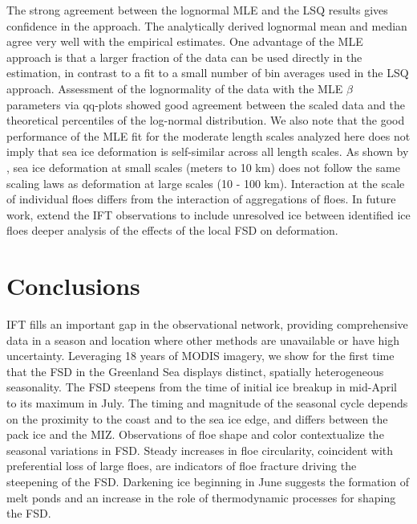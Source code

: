 \documentclass[review, jog]{igs}
\begin{document}
The strong agreement between the lognormal MLE and the LSQ results gives confidence in the approach. The analytically derived lognormal mean and median agree very well with the empirical estimates. 
One advantage of the MLE approach is that a larger fraction of the data can be used directly in the estimation, in contrast to a fit to a small number of bin averages used in the LSQ approach.
Assessment of the lognormality of the data with the MLE $\beta$ parameters via qq-plots showed good agreement between the scaled data and the theoretical percentiles of the log-normal distribution.
We also note that the good performance of the MLE fit for the moderate length scales analyzed here does not imply that sea ice deformation is self-similar across all length scales. As shown by \cite{hutchings2024_SeaIce}, sea ice deformation at small scales (meters to 10 km) does not follow the same scaling laws as deformation at large scales (10 - 100 km). Interaction at the scale of individual floes differs from the interaction of aggregations of floes. In future work, extend the IFT observations to include unresolved ice between identified ice floes  deeper analysis of the effects of the local FSD on deformation.

\section{Conclusions}
IFT fills an important gap in the observational network, providing comprehensive data in a season and location where other methods are unavailable or have high uncertainty.
Leveraging 18 years of MODIS imagery, we show for the first time that the FSD in the Greenland Sea displays distinct, spatially heterogeneous seasonality.
The FSD steepens from the time of initial ice breakup in mid-April to its maximum in July. 
The timing and magnitude of the seasonal cycle depends on the proximity to the coast and to the sea ice edge, and differs between the pack ice and the MIZ.
Observations of floe shape and color contextualize the seasonal variations in FSD.
Steady increases in floe circularity, coincident with preferential loss of large floes, are indicators of floe fracture driving the steepening of the FSD.
Darkening ice beginning in June suggests the formation of melt ponds and an increase in the role of thermodynamic processes for shaping the FSD.
\end{document}
